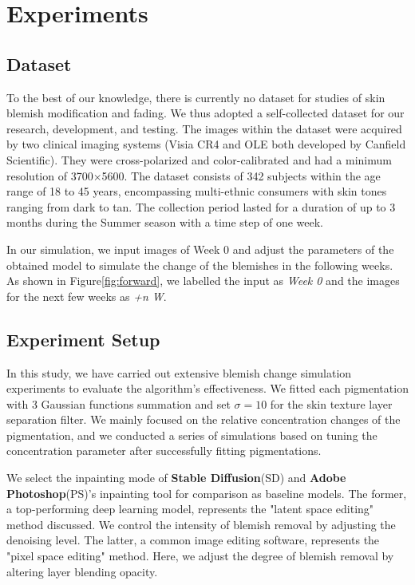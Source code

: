 
\chapter{Experiments}
\begin{spacing}{1.5}
\setlength{\parskip}{0.3in}
\section{Dataset}
To the best of our knowledge, there is currently no dataset for studies of skin blemish modification and fading. We thus adopted a self-collected dataset for our research, development, and testing. The images within the dataset were acquired by two clinical imaging systems (Visia CR4 and OLE both developed by Canfield Scientific). They were cross-polarized and color-calibrated and had a minimum resolution of 3700$\times$5600. The dataset consists of 342 subjects within the age range of 18 to 45 years, encompassing multi-ethnic consumers with skin tones ranging from dark to tan. The collection period lasted for a duration of up to 3 months during the Summer season with a time step of one week.

In our simulation, we input images of Week 0 and adjust the parameters of the obtained model to simulate the change of the blemishes in the following weeks. As shown in Figure\ref{fig:forward}, we labelled the input as \textit{Week 0} and the images for the next few weeks as \textit{+n W}.

\section{Experiment Setup}
In this study, we have carried out extensive blemish change simulation experiments to evaluate the algorithm's effectiveness. We fitted each pigmentation with 3 Gaussian functions summation and set $\sigma=10$ for the skin texture layer separation filter. We mainly focused on the relative concentration changes of the pigmentation, and we conducted a series of simulations based on tuning the concentration parameter after successfully fitting pigmentations.

We select the inpainting mode of \textbf{Stable Diffusion}(SD)\cite{rombach2021highresolution} and \textbf{Adobe Photoshop}(PS)'s inpainting tool\cite{adobephotoshop} for comparison as baseline models. The former, a top-performing deep learning model, represents the "latent space editing" method discussed. We control the intensity of blemish removal by adjusting the denoising level. The latter, a common image editing software, represents the "pixel space editing" method. Here, we adjust the degree of blemish removal by altering layer blending opacity.


\end{spacing}
